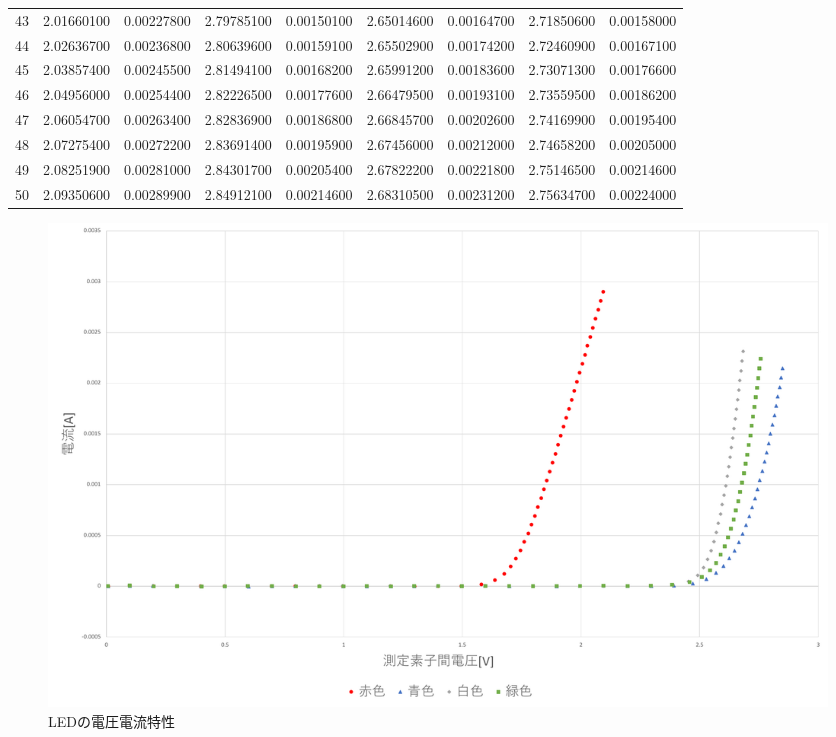 \begin{table}[h]
{\begin{tabular}{ccccccccc}
43     & 2.01660100 & 0.00227800  & 2.79785100 & 0.00150100  & 2.65014600 & 0.00164700 & 2.71850600 & 0.00158000  \\
44     & 2.02636700 & 0.00236800  & 2.80639600 & 0.00159100  & 2.65502900 & 0.00174200 & 2.72460900 & 0.00167100  \\
45     & 2.03857400 & 0.00245500  & 2.81494100 & 0.00168200  & 2.65991200 & 0.00183600 & 2.73071300 & 0.00176600  \\
46     & 2.04956000 & 0.00254400  & 2.82226500 & 0.00177600  & 2.66479500 & 0.00193100 & 2.73559500 & 0.00186200  \\
47     & 2.06054700 & 0.00263400  & 2.82836900 & 0.00186800  & 2.66845700 & 0.00202600 & 2.74169900 & 0.00195400  \\
48     & 2.07275400 & 0.00272200  & 2.83691400 & 0.00195900  & 2.67456000 & 0.00212000 & 2.74658200 & 0.00205000  \\
49     & 2.08251900 & 0.00281000  & 2.84301700 & 0.00205400  & 2.67822200 & 0.00221800 & 2.75146500 & 0.00214600  \\
50     & 2.09350600 & 0.00289900  & 2.84912100 & 0.00214600  & 2.68310500 & 0.00231200 & 2.75634700 & 0.00224000  \\
\hline
\end{tabular}
}
\end{table}

\begin{figure}[h]
 \centering
        \includegraphics[scale=0.45]{./fig/3-5.pdf}
	\caption{LEDの電圧電流特性}
	\label{fig:3-5}
\end{figure}
